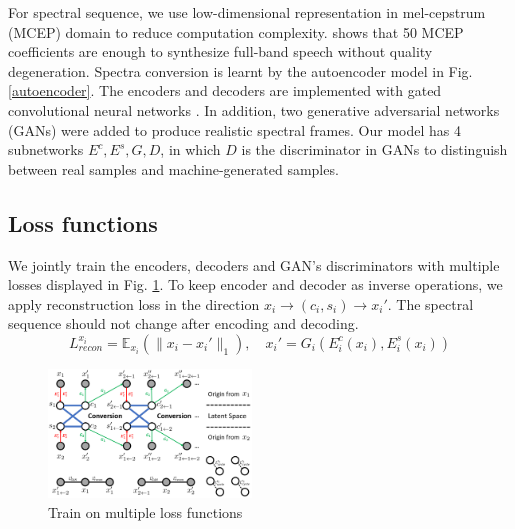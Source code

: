 \documentclass{article}
\begin{document}
For spectral sequence, we use low-dimensional representation in mel-cepstrum (MCEP) domain to reduce computation complexity. \cite{Huang_2017_ICCV} shows that 50 MCEP coefficients are enough to synthesize full-band speech without quality degeneration. Spectra conversion is learnt by the autoencoder model in Fig. \ref{autoencoder}. The encoders and decoders are implemented with gated convolutional neural networks \cite{dauphin2017language}. In addition, two generative adversarial networks (GANs) were added to produce realistic spectral frames. Our model has 4 subnetworks $E^c, E^s, G, D$, in which $D$ is the discriminator in GANs to distinguish between real samples and machine-generated samples.


\subsection{Loss functions}
We jointly train the encoders, decoders and GAN's discriminators with multiple losses displayed in Fig. \ref{loss}. To keep encoder and decoder as inverse operations, we apply reconstruction loss in the direction $x_i \rightarrow (c_i, s_i) \rightarrow x_i'$. The spectral sequence should not change after encoding and decoding.
\begin{equation}
L_{recon}^{x_i} = \mathbb{E}_{x_i}(\| x_i - x_i' \|_1), \quad x_i' = G_i(E_i^c(x_i), E_i^s(x_i))
\end{equation}

\begin{figure}[htb]
\includegraphics[width=0.48\textwidth]{FIG/loss}
\caption{Train on multiple loss functions}
\label{loss}
\end{figure}
\end{document}
